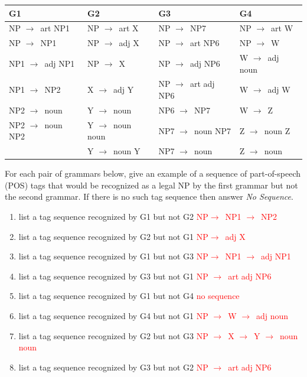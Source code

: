\documentclass[11pt]{article}
\newcommand{\ra}{$\rightarrow$~}
\begin{document}
\begin{enumerate}
\begin{center}
\begin{tabular}{|l|l|l|l|} \hline
{\bf G1} & {\bf G2} & {\bf G3} & {\bf G4} \\ \hline
NP \ra art NP1   & NP \ra art X    & NP \ra NP7         & NP \ra art W \\
NP \ra NP1       & NP \ra adj X    & NP \ra art NP6     & NP \ra W \\
NP1 \ra adj NP1  & NP \ra X        & NP \ra adj NP6     & W \ra adj noun \\
NP1 \ra NP2      & X \ra adj Y                & NP \ra art adj NP6 & W \ra adj W \\
NP2 \ra noun     & Y \ra noun      & NP6 \ra NP7        & W \ra Z \\
NP2 \ra noun NP2 & Y \ra noun noun      & NP7 \ra noun NP7   & Z \ra noun Z \\
~                & Y \ra noun Y & NP7 \ra noun       & Z \ra noun \\ \hline
\end{tabular}
\end{center}

For each pair of grammars below, give an example of a sequence of
part-of-speech (POS) tags that would be recognized as a legal NP by
the first grammar but not the second grammar. If there is no such tag sequence
then answer {\it No Sequence}.

\begin{enumerate}

\item  list a tag sequence recognized by G1 but not G2
\textcolor{red}{NP\ra NP1 \ra NP2}
\item list a tag sequence recognized by G2 but not G1
\textcolor{red}{NP\ra adj X}
\item list a tag sequence recognized by G1 but not G3
\textcolor{red}{NP\ra NP1 \ra adj NP1 }
\item list a tag sequence recognized by G3 but not G1
\textcolor{red}{NP \ra art adj NP6 }
\item list a tag sequence recognized by G1 but not G4
\textcolor{red}{no sequence}
\item list a tag sequence recognized by G4 but not G1
\textcolor{red}{NP \ra W \ra adj noun }
\item list a tag sequence recognized by G2 but not G3
\textcolor{red}{NP \ra X \ra Y \ra noun noun }
\item list a tag sequence recognized by G3 but not G2
\textcolor{red}{NP \ra art adj NP6 }


\end{enumerate}
\end{enumerate}
\end{document}
